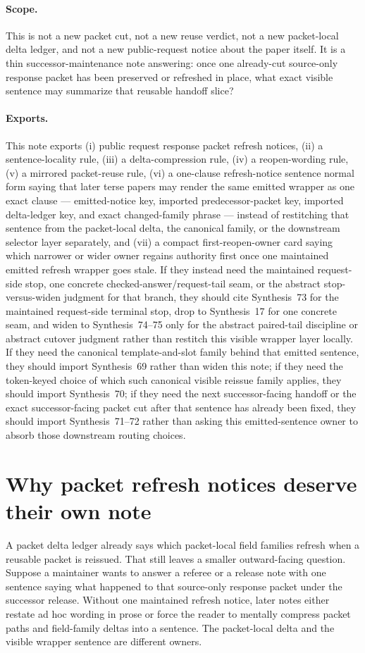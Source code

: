 \documentclass[11pt]{article}
\begin{document}
\paragraph{Scope.}
This is not a new packet cut, not a new reuse verdict, not a new packet-local delta ledger, and not a new public-request notice about the paper itself.
It is a thin successor-maintenance note answering: once one already-cut source-only response packet has been preserved or refreshed in place, what exact visible sentence may summarize that reusable handoff slice?

\paragraph{Exports.}
This note exports (i) public request response packet refresh notices, (ii) a sentence-locality rule, (iii) a delta-compression rule, (iv) a reopen-wording rule, (v) a mirrored packet-reuse rule, (vi) a one-clause refresh-notice sentence normal form saying that later terse papers may render the same emitted wrapper as one exact clause --- emitted-notice key, imported predecessor-packet key, imported delta-ledger key, and exact changed-family phrase --- instead of restitching that sentence from the packet-local delta, the canonical family, or the downstream selector layer separately, and (vii) a compact first-reopen-owner card saying which narrower or wider owner regains authority first once one maintained emitted refresh wrapper goes stale. If they instead need the maintained request-side stop, one concrete checked-answer/request-tail seam, or the abstract stop-versus-widen judgment for that branch, they should cite Synthesis~73 for the maintained request-side terminal stop, drop to Synthesis~17 for one concrete seam, and widen to Synthesis~74--75 only for the abstract paired-tail discipline or abstract cutover judgment rather than restitch this visible wrapper layer locally. If they need the canonical template-and-slot family behind that emitted sentence, they should import Synthesis~69 rather than widen this note; if they need the token-keyed choice of which such canonical visible reissue family applies, they should import Synthesis~70; if they need the next successor-facing handoff or the exact successor-facing packet cut after that sentence has already been fixed, they should import Synthesis~71--72 rather than asking this emitted-sentence owner to absorb those downstream routing choices.

\section{Why packet refresh notices deserve their own note}
A packet delta ledger already says which packet-local field families refresh when a reusable packet is reissued.
That still leaves a smaller outward-facing question.
Suppose a maintainer wants to answer a referee or a release note with one sentence saying what happened to that source-only response packet under the successor release.
Without one maintained refresh notice, later notes either restate ad hoc wording in prose or force the reader to mentally compress packet paths and field-family deltas into a sentence.
The packet-local delta and the visible wrapper sentence are different owners.
\end{document}
